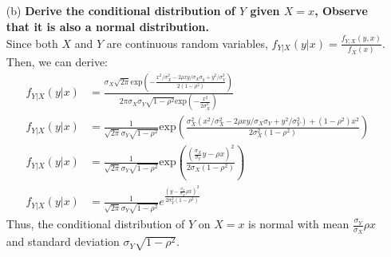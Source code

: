 \documentclass{article}
\begin{document}
\begin{itemize}
	\item[(b)] \textbf{Derive the conditional distribution of $Y$ given $X=x$, Observe that it is also a normal distribution.}
		\bigskip \\	
		Since both $X$ and $Y$ are continuous random variables, $f_{Y|X}(y|x)= \frac{f_{Y,X}(y,x)}{f_X(x)}$. Then, we can derive:
		\begin{align*}
			f_{Y|X}(y|x) &= \frac{\sigma_X\sqrt{2\pi}\text{exp}\left(-\frac{x^2/\sigma_X^2-2\rho xy/\sigma_X\sigma_y+y^2/\sigma_Y^2}{2(1-\rho^2)}\right)}{2\pi\sigma_X\sigma_Y\sqrt{1-\rho^2}\text{exp}\left(-\frac{x^2}{2\sigma_X^2}\right)}	\\
			f_{Y|X}(y|x) &= \frac{1}{\sqrt{2\pi}\sigma_Y\sqrt{1-\rho^2}}\text{exp}\left(\frac{\sigma_X^2(x^2/\sigma_X^2 - 2\rho xy/\sigma_X\sigma_Y+y^2/\sigma^2_Y)+(1-\rho^2)x^2}{2\sigma_X^2(1-\rho^2)}\right) \\
			f_{Y|X}(y|x) &= \frac{1}{\sqrt{2\pi}\sigma_Y\sqrt{1-\rho^2}}\text{exp}\left( \frac{\left(\frac{\sigma_X}{\sigma_Y}y-\rho x\right)^2}{2\sigma_X(1-\rho^2)} \right) \\
			f_{Y|X}(y|x) &= \frac{1}{\sqrt{2\pi}\sigma_Y\sqrt{1-\rho^2}}e^{\frac{\left(y-\frac{\sigma_Y}{\sigma_X}\rho x\right)^2}{2\sigma^2_Y(1-\rho^2)}}
		\end{align*}
		Thus, the conditional distribution of $Y$ on $X=x$ is normal with mean $\frac{\sigma_Y}{\sigma_X}\rho x$ and standard deviation $\sigma_Y\sqrt{1-\rho^2}$.
		

\end{itemize}
\end{document}
